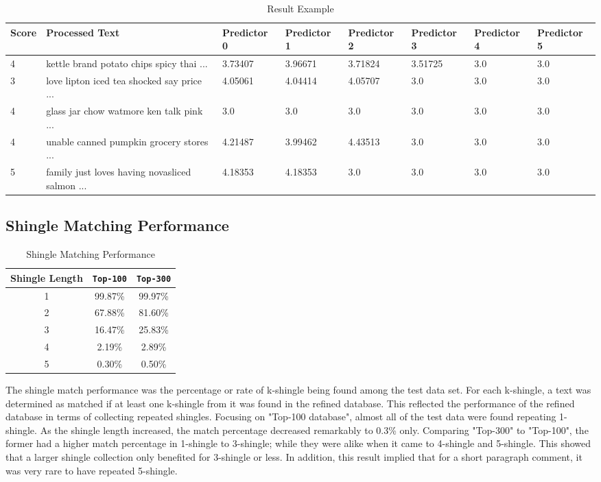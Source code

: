 \begin{table*}
	\caption{Result Example}
	\label{tab:commands}
	\begin{tabular}{llllllll}
	\toprule
	Score &	Processed Text & Predictor 0 & Predictor 1 & Predictor 2 &	Predictor 3 & Predictor 4 & Predictor 5 \\
	\midrule
	4	& kettle brand potato chips spicy thai ...& 3.73407	 &3.96671	&3.71824	 & 3.51725&3.0 & 3.0\\
	3&love lipton iced tea shocked say price ... &	4.05061 	& 4.04414	&4.05707&	3.0&	3.0	&3.0\\
	4&glass jar chow watmore ken talk pink ...&	3.0 &	3.0	&3.0	&3.0	&3.0	 &3.0\\
	4 &unable canned pumpkin grocery stores ...	& 4.21487 &	3.99462	& 4.43513	 & 3.0	& 3.0	&3.0\\
	5&family just loves having novasliced salmon ...&	4.18353	&4.18353	&3.0	&3.0	&3.0	&3.0\\

	\bottomrule
\end{tabular}
\end{table*}

\subsection{Shingle Matching Performance}

\begin{table}[H]
\caption{Shingle Matching Performance}
		\begin{tabular}{ccc}
			\toprule
				Shingle Length & \texttt{Top-100} & \texttt{Top-300} \\
			\midrule
				1 & 99.87\% & 99.97\% \\
				2 & 67.88\% & 81.60\% \\
				3 & 16.47\% & 25.83\% \\
				4 & 2.19\%  & 2.89\% \\
				5 & 0.30\%  & 0.50\% \\
			\bottomrule
		\end{tabular}
\end{table}

The shingle match performance was the percentage or rate of k-shingle being found among the test data set. 
For each k-shingle, a text was determined as matched if at least one k-shingle from it was found in the refined database. 
This reflected the performance of the refined database in terms of collecting repeated shingles. 
Focusing on "Top-100 database", almost all of the test data were found repeating 1-shingle. As the shingle length increased, the match percentage decreased remarkably to 0.3\% only. 
Comparing "Top-300" to "Top-100", the former had a higher match percentage in 1-shingle to 3-shingle; while they were alike when it came to 4-shingle and 5-shingle.
This showed that a larger shingle collection only benefited for 3-shingle or less. In addition, this result implied that for a short paragraph comment, it was very rare to have repeated 5-shingle. 

